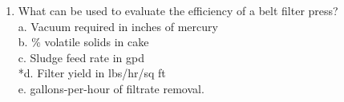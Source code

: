 \begin{tcolorbox}[breakable, enhanced,
colframe=blue!25,
colback=blue!10,
coltitle=blue!20!black,  
title= Chapter Assessment]
\begin{enumerate}
a. would not affect the moisture content of the cake. \\
b. would produce a drier cake \\
*c. would produce a wetter cake, but produce a greater solids recovery. \\
d. would not affect either solids recovery, nor cake moisture content. \\
e. would require an increase in the cationic polymer dosage. \\

\item  What can be used to evaluate the efficiency of a belt filter press? \\

a. Vacuum required in inches of mercury \\
b. \% volatile solids in cake \\
c. Sludge feed rate in gpd \\
*d. Filter yield in lbs/hr/sq ft \\
e. gallons-per-hour of filtrate removal. \\

\end{enumerate}
\end{tcolorbox}